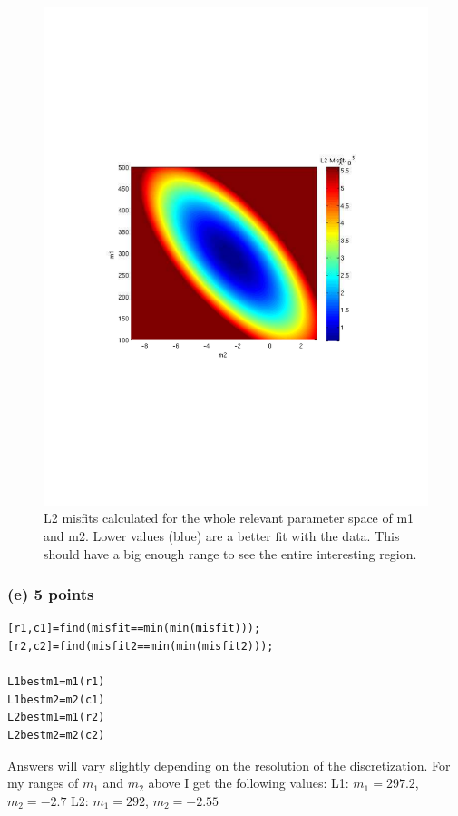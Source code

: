 \documentclass[11pt]{article}
\begin{document}
\begin{figure}[htbp]
	\centerline{\includegraphics[width=1\textwidth]{L2Misfits.pdf}}
	\caption{\label{p1}%
	L2 misfits calculated for the whole relevant parameter space of m1 and m2.  Lower values (blue) are a better fit with the data.  This should have a big enough range to see the entire interesting region.}
\end{figure}

\subsubsection*{(e) 5 points}
\begin{verbatim}
[r1,c1]=find(misfit==min(min(misfit)));
[r2,c2]=find(misfit2==min(min(misfit2)));

L1bestm1=m1(r1)
L1bestm2=m2(c1)
L2bestm1=m1(r2)
L2bestm2=m2(c2)
\end{verbatim}

Answers will vary slightly depending on the resolution of the discretization.  For my ranges of $m_1$ and $m_2$ above I get the following values:
L1: $m_1 = 297.2$, $m_2 = -2.7$
L2: $m_1 = 292$, $m_2 = -2.55$
\end{document}
